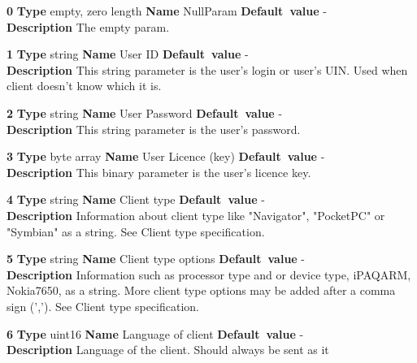 \begin{list}{\textbf{ParamID}}{}
\item \textbf{0} \textbf{Type} empty, zero length \textbf{Name} NullParam
                 \textbf{Default~value} - \\
  \label{NullParam}
  \textbf{Description} The empty param.
\item \textbf{1} \textbf{Type} string \textbf{Name} User ID
                 \textbf{Default~value} - \\
  \label{User ID}
  \textbf{Description} This string parameter is the user's login or user's
  UIN. Used when client doesn't know which it is.
\item \textbf{2} \textbf{Type} string \textbf{Name} User Password
                 \textbf{Default~value} - \\
  \label{User Password}
  \textbf{Description} This string parameter is the user's password.
\item \textbf{3} \textbf{Type} byte array \textbf{Name} User Licence (key)
                 \textbf{Default~value} - \\
  \label{User Licence (key)}
  \textbf{Description} This binary parameter is the user's licence key.
\item \textbf{4} \textbf{Type} string \textbf{Name} Client type
                 \textbf{Default~value} - \\
 \textbf{Description} Information about client type like "Navigator", 
  "PocketPC" or "Symbian" as a string. See Client type specification.
\item \textbf{5} \textbf{Type} string \textbf{Name} Client type options
                 \textbf{Default~value} - \\
  \textbf{Description} Information such as processor type and or device type,
  iPAQARM, Nokia7650, as a string. More client type options may be added
  after a comma sign (','). See Client type specification.
\item \textbf{6} \textbf{Type} uint16 \textbf{Name} Language of client
                 \textbf{Default~value} - \\
  \label{LanguageClient}
  \textbf{Description} Language of the client. Should always be sent as it

\end{list}
